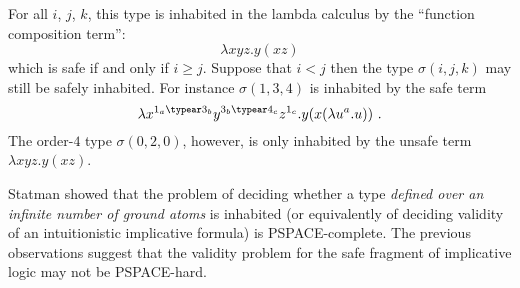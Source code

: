 For all $i$, $j$, $k$, this type is inhabited in the lambda calculus
by the ``function composition term'':
$$\lambda x y z . y (x z) $$
which is safe if and only if $i\geq j$. Suppose that $i<j$ then the type
$\sigma(i,j,k)$ may still be safely inhabited. For instance
$\sigma(1,3,4)$ is inhabited by the safe term
$$ \lambda x^{1_a \typear 3_b} y^{3_b \typear 4_c} z^{1_c} . y (x (\lambda u^a . u)) \ .$$
The order-$4$ type $\sigma(0,2,0)$, however, is only inhabited by the unsafe term $\lambda x y z . y (x z) $.


Statman showed \cite{Statman1979} that the problem of deciding
whether a type \emph{defined over an infinite number of ground
atoms} is inhabited (or equivalently of deciding validity of an
intuitionistic implicative formula) is PSPACE-complete. The previous
observations suggest that the validity problem for the safe fragment
of implicative logic may not be PSPACE-hard.
